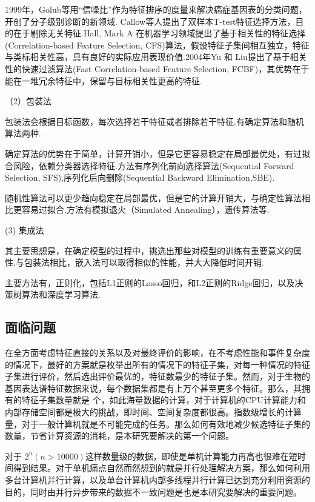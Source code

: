 \documentclass{njubachelor}
\begin{document}
1999年，Golub等用“信噪比”作为特征排序的度量来解决癌症基因表的分类问题，开创了分子级别诊断的新领域. Callow等人提出了双样本T-test特征选择方法，目的在于剔除无关特征.Hall, Mark A 在机器学习领域提出了基于相关性的特征选择(Correlation-based Feature Selection, CFS)算法，假设特征子集间相互独立，特征与类标相关性高，具有良好的实际应用表现价值.2004年Yu 和 Liu提出了基于相关性的快速过滤算法(Fast Correlation-based Feature Selection, FCBF)，其优势在于能在一堆冗余特征中，保留与目标相关性更高的特征.

    （2）包装法

包装法会根据目标函数，每次选择若干特征或者排除若干特征.有确定算法和随机算法两种.

    确定算法的优势在于简单，计算开销小，但是它更容易稳定在局部最优处，有过拟合风险，依赖分类器选择特征.方法有序列化前向选择算法(Sequential Forward Selection, SFS),序列化后向删除(Sequential Backward Elimination,SBE).

随机性算法可以更少趋向稳定在局部最优，但是它的计算开销大，与确定性算法相比更容易过拟合.方法有模拟退火（Simulated Annealing），遗传算法等.

    (3) 集成法

    其主要思想是，在确定模型的过程中，挑选出那些对模型的训练有重要意义的属性.与包装法相比，嵌入法可以取得相似的性能，并大大降低时间开销.
   
    主要方法有，正则化，包括L1正则的Lasso回归，和L2正则的Ridge回归，以及决策树算法和深度学习算法.

\subsection{面临问题}
在全方面考虑特征直接的关系以及对最终评价的影响，在不考虑性能和事件复杂度的情况下，最好的方案就是枚举出所有的情况下的特征子集，对每一种情况的特征子集进行评价，然后选出评价最优的，特征数最少的特征子集。然而，对于生物的基因表达谱特征数据来说，每个数据集都是有上万个甚至更多个特征。那么，其拥有的特征子集数量就是  个，如此海量数据的计算，对于计算机的CPU计算能力和内部存储空间都是极大的挑战，即时间、空间复杂度都很高。指数级增长的计算量，对于一般计算机就是不可能完成的任务。那么如何有效地减少候选特征子集的数量，节省计算资源的消耗，是本研究要解决的第一个问题。

对于 $2^n(n > 10000)$这样数量级的数据，即使是单机计算能力再高也很难在短时间得到结果。对于单机痛点自然而然想到的就是并行处理解决方案，那么如何利用多台计算机并行计算，以及单台计算机内部多线程并行计算已达到充分利用资源的目的，同时由并行异步带来的数据不一致问题是也是本研究要解决的重要问题。
\end{document}
